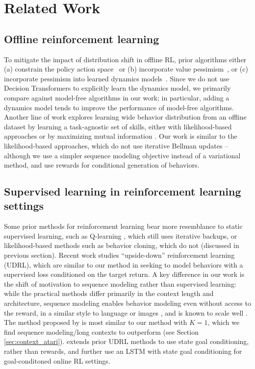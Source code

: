 
\section{Related Work}

\subsection{Offline reinforcement learning}

To mitigate the impact of distribution shift in offline RL, prior algorithms either (a) constrain the policy action space~\citep{fujimoto2019off, kumar2019stabilizing, siegel2020keep} or (b) incorporate value pessimism~\citep{fujimoto2019off,kumar2020conservative}, or (c) incorporate pessimism into learned dynamics models~\cite{kidambi2020morel, yu2020mopo}.
Since we do not use Decision Transformers to explicitly learn the dynamics model, we primarily compare against model-free algorithms in our work; in particular, adding a dynamics model tends to improve the performance of model-free algorithms.
Another line of work explores learning wide behavior distribution from an offline dataset by learning a task-agnostic set of skills, either with likelihood-based approaches \citep{ajay2020opal, campos2020edl,pertsch2020spirl,singh2021parrot} or by maximizing mutual information \citep{eysenbach2018diversity, lu2020lisp, sharmaGLKH20dads}.
Our work is similar to the likelihood-based approaches, which do not use iterative Bellman updates -- although we use a simpler sequence modeling objective instead of a variational method, and use rewards for conditional generation of behaviors.

\subsection{Supervised learning in reinforcement learning settings}

Some prior methods for reinforcement learning bear more resemblance to static supervised learning, such as Q-learning \citep{watkins1989qlearning, mnih2013dqn}, which still uses iterative backups, or likelihood-based methods such as behavior cloning, which do not (discussed in previous section).
Recent work \citep{srivastava2019udrl, kumar2019rcp, ogma2019blog} studies ``upside-down'' reinforcement learning (UDRL), which are similar to our method in seeking to model behaviors with a supervised loss conditioned on the target return.
A key difference in our work is the shift of motivation to sequence modeling rather than supervised learning: while the practical methods differ primarily in the context length and architecture, sequence modeling enables behavior modeling even without access to the reward, in a similar style to language \citep{radford2018gpt} or images \citep{chen2020igpt}, and is known to scale well \citep{brown2020gpt3}.
The method proposed by \citet{kumar2019rcp} is most similar to our method with $K=1$, which we find sequence modeling/long contexts to outperform (see Section \ref{sec:context_atari}).
\citet{ghosh2019gcsl} extends prior UDRL methods to use state goal conditioning, rather than rewards, and \citet{paster2020glamor} further use an LSTM with state goal conditioning for goal-conditoned online RL settings.

